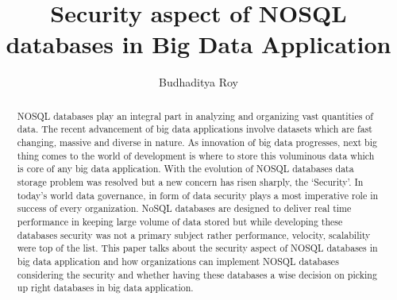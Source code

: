 \documentclass[sigconf]{acmart}
\begin{document}
\title{Security aspect of NOSQL databases in Big Data Application}


\author{Budhaditya Roy}

\renewcommand{\shortauthors}{B.Roy.}


\begin{abstract}
NOSQL databases play an integral part in analyzing and organizing vast quantities of data. The recent advancement of big data applications involve datasets which are fast changing, massive and diverse in nature. As innovation of big data progresses, next big thing comes to the world of development is where to store this voluminous data which is core of any big data application. With the evolution of NOSQL databases data storage problem was resolved but a new concern has risen sharply, the ‘Security’. In today’s world data governance, in form of data security plays a most imperative role in success of every organization.  NoSQL databases are designed to deliver real time performance in keeping large volume of data stored but while developing these databases security was not a primary subject rather performance, velocity, scalability were top of the list. This paper talks about the security aspect of NOSQL databases in big data application and how organizations can implement NOSQL databases considering the security and whether having these databases a wise decision on picking up right databases in big data application.
\end{abstract}



\maketitle
\end{document}

